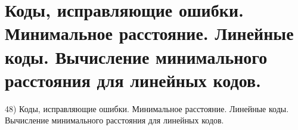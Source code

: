 \section{
 Коды, исправляющие ошибки. Минимальное расстояние. Линейные коды. Вычисление минимального расстояния для линейных кодов.
}

48) Коды, исправляющие ошибки. Минимальное расстояние. Линейные коды. Вычисление минимального расстояния для линейных кодов.
